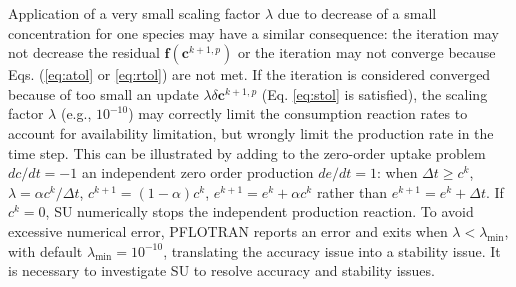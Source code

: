 \documentclass[gmd, manuscript]{copernicus}
\begin{document}
Application of a very small scaling factor $\lambda$ due to decrease of a small
concentration for one species may have a similar consequence: the iteration may
not decrease the residual $\mathbf{f}(\mathbf{c}^{k+1,p})$ or the iteration
may not converge because Eqs. (\ref{eq:atol} or \ref{eq:rtol}) are not met. If
the iteration is considered converged because of too small an update $\lambda
\delta \mathbf{c}^{k+1,p}$ (Eq. \ref{eq:stol} is satisfied), the scaling factor
$\lambda$ (e.g., $10^{-10}$) may correctly limit the consumption reaction
rates to account for availability limitation, but wrongly limit the production
rate in the time step. This can be illustrated by adding to the zero-order
uptake problem $dc/dt=-1$ an independent zero order production $de/dt=1$: when
$\Delta t \geq c^k$, $\lambda =\alpha c^k/\Delta t$, $c^{k+1}=(1-\alpha)c^k$,
$e^{k+1}=e^k+\alpha c^k$ rather than $e^{k+1}=e^k+\Delta t$. If $c^k=0$, SU
numerically stops the independent production reaction. 
To avoid excessive numerical error, PFLOTRAN reports an error and exits when
$\lambda < \lambda _\text{min}$, with default $\lambda _\text{min}=10^{-10}$,
translating the accuracy issue into a stability issue. It is necessary to
investigate SU to resolve accuracy and stability issues. 

\end{document}
